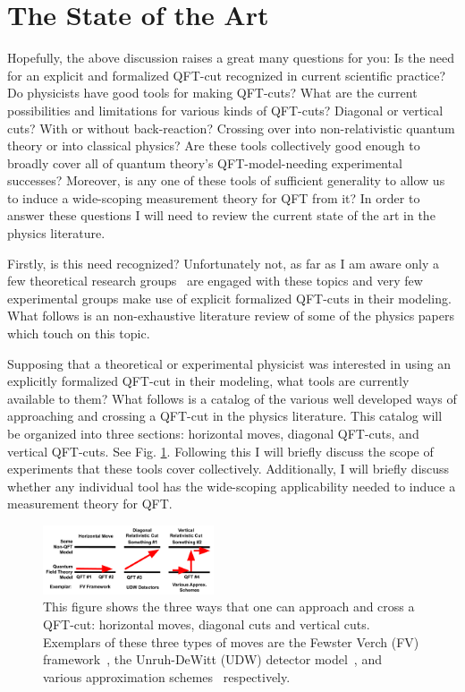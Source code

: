 \documentclass[prd,twocolumn,superscriptaddress,floatfix,amsmath,amssymb,amsfonts,nofootinbib]{revtex4-2}
\begin{document}
\section{The State of the Art}\label{StateOfTheArt}
Hopefully, the above discussion raises a great many questions for you: Is the need for an explicit and formalized QFT-cut recognized in current scientific practice? Do physicists have good tools for making QFT-cuts? What are the current possibilities and limitations for various kinds of QFT-cuts? Diagonal or vertical cuts? With or without back-reaction? Crossing over into non-relativistic quantum theory or into classical physics? Are these tools collectively good enough to broadly cover all of quantum theory's QFT-model-needing experimental successes? Moreover, is any one of these tools of sufficient generality to allow us to induce a wide-scoping measurement theory for QFT from it? In order to answer these questions I will need to review the current state of the art in the physics literature.

Firstly, is this need recognized? Unfortunately not, as far as I am aware only a few theoretical research groups~\cite{pologomez2021detectorbased,fewster1,fewster2,fewster3,Anastopoulos2022,TaleOfTwo,Ruep2021,JoseMariaEdu,BorstenJubbKells} are engaged with these topics and very few experimental groups make use of explicit formalized QFT-cuts in their modeling. What follows is an non-exhaustive literature review of some of the physics papers which touch on this topic.

Supposing that a theoretical or experimental physicist was interested in using an explicitly formalized QFT-cut in their modeling, what tools are currently available to them? What follows is a catalog of the various well developed ways of approaching and crossing a QFT-cut in the physics literature. This catalog will be organized into three sections: horizontal moves, diagonal QFT-cuts, and vertical QFT-cuts. See Fig. \ref{FigFVUDW}. Following this I will briefly discuss the scope of experiments that these tools cover collectively. Additionally, I will briefly discuss whether any individual tool has the wide-scoping applicability needed to induce a measurement theory for QFT.

\begin{figure}
\includegraphics[width=0.45\textwidth]{Figures/FVvsUDW.pdf}
\caption{This figure shows the three ways that one can approach and cross a QFT-cut: horizontal moves, diagonal cuts and vertical cuts. Exemplars of these three types of moves are the Fewster Verch (FV) framework~\cite{fewster1,fewster2,fewster3}, the Unruh-DeWitt (UDW) detector model~\cite{Unruh1976,BLHu2007, Brown2013, Hotta2020, Zeromode,TaleOfTwo,Adam,Valentini1991, Reznik2003, Pozas-Kerstjens:2015,Menicucci, Terno2016, Cosmo, Henderson2018,pologomez2021detectorbased}, and various approximation schemes~\cite{Rosaler,FlaminiaAchim} respectively.}\label{FigFVUDW}
\end{figure}
\end{document}
